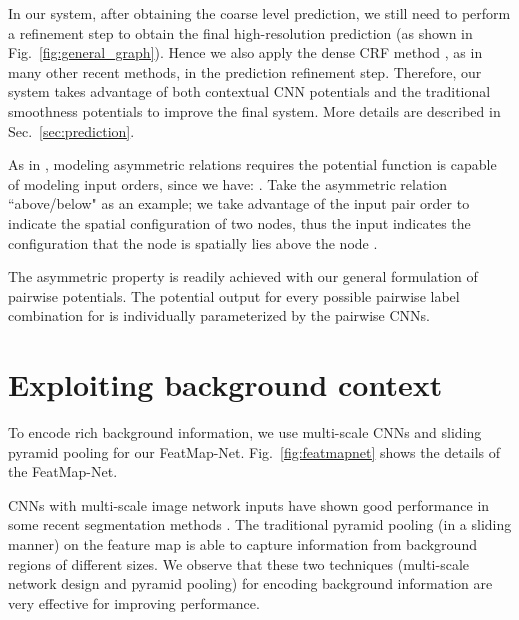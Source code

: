 In our system, after obtaining the coarse level prediction, we still need to perform a refinement step to obtain the final high-resolution prediction 
(as shown in Fig.~\ref{fig:general_graph}).
Hence we also apply the dense CRF method \cite{krahenbuhl2012efficient}, as in many other recent methods, in the prediction refinement step.
Therefore, our system takes advantage of both contextual CNN potentials and the traditional smoothness potentials to improve the final system.
More details are described in Sec.~\ref{sec:prediction}.









As in \cite{winn2006layout,heesch2010markov},
modeling asymmetric relations requires the potential function is capable of modeling input orders, 
since we have: .
Take the asymmetric relation ``above/below" as an example;
we take advantage of the input pair order to indicate the spatial configuration of two nodes,
thus the input 
indicates the configuration that the node  is spatially lies above the node .

The asymmetric property is readily achieved with our general formulation of pairwise potentials.  
The potential output for every possible pairwise label combination for  is individually parameterized by the pairwise CNNs.  



























\section{Exploiting background context}
\label{sec:network_details}

To encode rich background information,
we use multi-scale CNNs and  sliding pyramid pooling \cite{lazebnik2006beyond} for our FeatMap-Net.
Fig.~\ref{fig:featmapnet} shows the details of the FeatMap-Net.


CNNs with multi-scale image network inputs have shown good performance in some recent segmentation methods \cite{farabet2013learning,MostajabiYS14}.
The traditional pyramid pooling (in a sliding manner) on the feature map is able to capture information from background regions of different sizes.
We observe that these two techniques (multi-scale network design and pyramid pooling) 
for encoding background information are very effective for improving performance.



